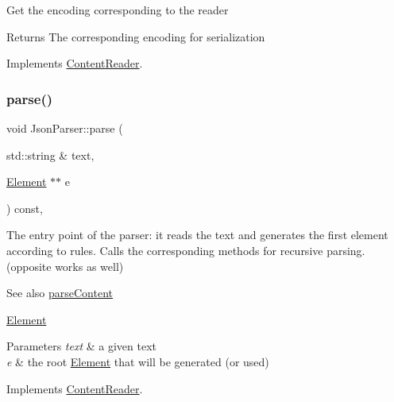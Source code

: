Get the encoding corresponding to the reader

\begin{DoxyReturn}{Returns}
The corresponding encoding for serialization 
\end{DoxyReturn}


Implements \mbox{\hyperlink{classContentReader_a1495a4402c4fac02d8cd2542b61c6eed}{Content\+Reader}}.

\mbox{\label{classJsonParser_a3ec3a9fcc8a63f987b4749d60b0568df}} 
\subsubsection{\texorpdfstring{parse()}{parse()}}
{\footnotesize\ttfamily void Json\+Parser\+::parse (\begin{DoxyParamCaption}\item[{std\+::string \&}]{text,  }\item[{\mbox{\hyperlink{classElement}{Element}} $\ast$$\ast$}]{e }\end{DoxyParamCaption}) const\hspace{0.3cm}{\ttfamily [override]}, {\ttfamily [virtual]}}

The entry point of the parser\+: it reads the text and generates the first element according to rules. Calls the corresponding methods for recursive parsing. (opposite works as well) \begin{DoxySeeAlso}{See also}
\mbox{\hyperlink{classJsonParser_ac80cf84ff2565f4c1f3a0f5ddb559c96}{parse\+Content}} 

\mbox{\hyperlink{classElement}{Element}}
\end{DoxySeeAlso}

\begin{DoxyParams}{Parameters}
{\em text} & a given text \\
\hline
{\em e} & the root \mbox{\hyperlink{classElement}{Element}} that will be generated (or used) \\
\hline
\end{DoxyParams}


Implements \mbox{\hyperlink{classContentReader_a7fff2e63a2e8fa216665604f69974e1d}{Content\+Reader}}.

\mbox{\label{classJsonParser_ac80cf84ff2565f4c1f3a0f5ddb559c96}} 
